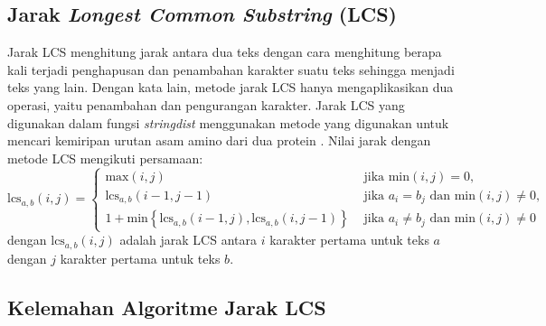 \subsection{Jarak \textit{Longest Common Substring} (LCS)}

Jarak LCS menghitung jarak antara dua teks dengan cara menghitung berapa kali terjadi penghapusan dan penambahan karakter suatu teks sehingga menjadi teks yang lain. Dengan kata lain, metode jarak LCS hanya mengaplikasikan dua operasi, yaitu penambahan dan pengurangan karakter. Jarak LCS yang digunakan dalam fungsi \textit{stringdist} menggunakan metode yang digunakan untuk mencari kemiripan urutan asam amino dari dua protein \parencite{needleman1970general}. Nilai jarak dengan metode LCS mengikuti persamaan:
\begin{equation} \label{eq:lcs}
	\text{lcs}_{a,b}(i,j)=\begin{cases}
		\text{max}(i,j) & \text{ jika min} (i,j)=0, \\ 
		\text{lcs}_{a,b}(i-1,j-1) & \text{ jika } a_{i}=b_{j} \text{ dan min} (i,j)\neq 0, \\
		1 + \text{min}\left \{ \text{lcs}_{a,b}(i-1,j), \text{lcs}_{a,b}(i,j-1) \right \} & \text{ jika } a_{i}\neq b_{j} \text{ dan min} (i,j)\neq 0
	\end{cases}
\end{equation}
\noindent
dengan $\text{lcs}_{a,b}(i,j)$ adalah jarak LCS antara $i$ karakter pertama untuk teks $a$ dengan $j$ karakter pertama untuk teks $b$.

\subsection{Kelemahan Algoritme Jarak LCS}


